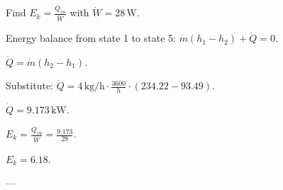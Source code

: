Find \( E_k = \frac{Q_{zu}}{\dot{W}} \) with \( \dot{W} = 28 \, \text{W} \).  

Energy balance from state 1 to state 5:  
\( \dot{m} (h_1 - h_2) + \dot{Q} = 0 \).  

\( \dot{Q} = \dot{m} (h_2 - h_1) \).  

Substitute:  
\( \dot{Q} = 4 \, \text{kg/h} \cdot \frac{3600}{h} \cdot (234.22 - 93.49) \).  

\( \dot{Q} = 9.173 \, \text{kW} \).  

\( E_k = \frac{Q_{zu}}{\dot{W}} = \frac{9.173}{28} \).  

\( E_k = 6.18 \).  

---